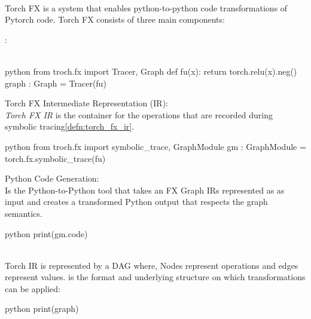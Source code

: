 \begin{defnbox}\nospacing
    \begin{defn}[Torch FX]\label{defn:torch_fx}\leavevmode\\
        Torch FX is a system that enables python-to-python code transformations of Pytorch code.
        Torch FX consists of three  main components:
        \begin{circlelistnosep}
            \item \textit{}:\\
            \\
            \begin{mintlinebox}{python}
                from troch.fx import Tracer, Graph
                def fu(x):
                    return torch.relu(x).neg()
                graph : Graph = Tracer(fu)
            \end{mintlinebox}
            \item Torch FX Intermediate Representation (IR): \\
            \textit{Torch FX IR} is the container for the operations that are recorded during symbolic tracing\cref{defn:torch_fx_ir}.
            \begin{mintlinebox}{python}
                from troch.fx import symbolic_trace, GraphModule
                gm : GraphModule = torch.fx.symbolic_trace(fu)
            \end{mintlinebox}
            \item Python Code Generation:\\
            Is the Python-to-Python tool that takes an FX Graph IRs represented as  as input and creates a transformed Python output that respects the graph semantics.
            \begin{mintlinebox}{python}
                print(gm.code)
            \end{mintlinebox}
        \end{circlelistnosep}
    \end{defn}
\end{defnbox}
\begin{defnbox}\nospacing
    \begin{defn}\label{defn:torch_fx_ir}\leavevmode\\
        Torch IR is represented by a DAG where, Nodes represent operations and edges represent values.
         is the format and underlying structure on which  transformations can be applied:
        \begin{mintlinebox}{python}
           print(graph)
        \end{mintlinebox}
    \end{defn}
\end{defnbox}
